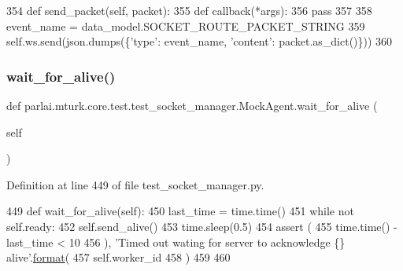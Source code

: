 \begin{DoxyCode}
354     \textcolor{keyword}{def }send\_packet(self, packet):
355         \textcolor{keyword}{def }callback(*args):
356             \textcolor{keywordflow}{pass}
357 
358         event\_name = data\_model.SOCKET\_ROUTE\_PACKET\_STRING
359         self.ws.send(json.dumps(\{\textcolor{stringliteral}{'type'}: event\_name, \textcolor{stringliteral}{'content'}: packet.as\_dict()\}))
360 
\end{DoxyCode}
\mbox{\label{classparlai_1_1mturk_1_1core_1_1test_1_1test__socket__manager_1_1MockAgent_afb67694efb9a09d70b0d73eceae3a702}} 
\subsubsection{\texorpdfstring{wait\+\_\+for\+\_\+alive()}{wait\_for\_alive()}}
{\footnotesize\ttfamily def parlai.\+mturk.\+core.\+test.\+test\+\_\+socket\+\_\+manager.\+Mock\+Agent.\+wait\+\_\+for\+\_\+alive (\begin{DoxyParamCaption}\item[{}]{self }\end{DoxyParamCaption})}



Definition at line 449 of file test\+\_\+socket\+\_\+manager.\+py.


\begin{DoxyCode}
449     \textcolor{keyword}{def }wait\_for\_alive(self):
450         last\_time = time.time()
451         \textcolor{keywordflow}{while} \textcolor{keywordflow}{not} self.ready:
452             self.send\_alive()
453             time.sleep(0.5)
454             \textcolor{keyword}{assert} (
455                 time.time() - last\_time < 10
456             ), \textcolor{stringliteral}{'Timed out wating for server to acknowledge \{\} alive'}.\hyperlink{namespaceparlai_1_1chat__service_1_1services_1_1messenger_1_1shared__utils_a32e2e2022b824fbaf80c747160b52a76}{format}(
457                 self.worker\_id
458             )
459 
460 
\end{DoxyCode}


